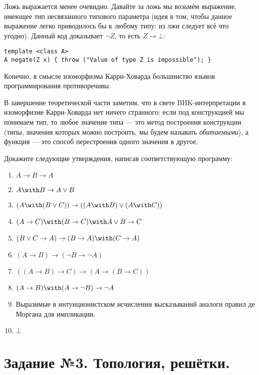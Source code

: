 \documentclass[10pt,a4paper,oneside]{article}
\begin{document}
\begin{enumerate}
Ложь выражается менее очевидно. Давайте за ложь мы возьмём выражение, имеющее тип несвязанного типового параметра
(идея в том, чтобы данное выражение легко приводилось бы к любому типу: из лжи следует всё что угодно). 
Данный код доказывает $\neg Z$, то есть $Z \rightarrow \bot$: 
\begin{verbatim}
template <class A>   
A negate(Z x) { throw ("Value of type Z is impossible"); }
\end{verbatim}

Конечно, в смысле изоморфизма Карри-Ховарда большинство языков программирования противоречивы.

В завершение теоретической части заметим, что в свете BHK-интерпретации в изоморфизме Карри-Ховарда нет
ничего странного: если под конструкцией мы понимаем тип, то любое значение типа --- это метод построения конструкции
(типы, значения которых можно построить, мы будем называть \emph{обитаемыми}), 
а функция --- это способ перестроения одного значения в другое.

Докажите следующие утверждения, написав соответствующую программу:
\begin{enumerate}
\item $A \rightarrow B \rightarrow A$
\item $A \with B \rightarrow A \vee B$
\item $(A \with (B \vee C)) \rightarrow ((A \with B) \vee (A \with C))$
\item $(A \rightarrow C) \with (B \rightarrow C) \with A \vee B \rightarrow C$
\item $(B \vee C \rightarrow A) \rightarrow (B \rightarrow A) \with (C \rightarrow A)$
\item $(A \rightarrow B) \rightarrow (\neg B \rightarrow \neg A)$
\item $((A \rightarrow B) \rightarrow C) \rightarrow (A \rightarrow (B \rightarrow C))$
\item $(A \rightarrow B) \with (A \rightarrow \neg B) \rightarrow \neg A$
\item Выразимые в интуиционистском исчислении высказываний аналоги правил де Моргана для импликации.
\item $\bot$
\end{enumerate}
\end{enumerate}

\section*{Задание №3. Топология, решётки.}
\end{document}
